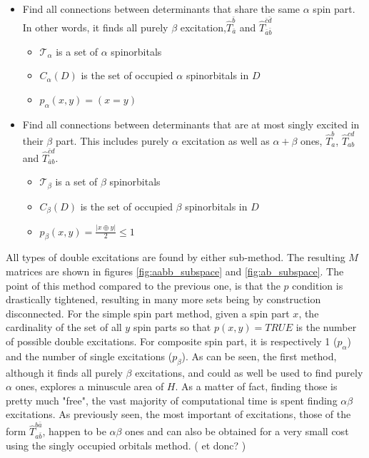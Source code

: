 \documentclass[./thesis.tex]{subfiles}
\begin{document}
\begin{itemize}
\item
Find all connections between determinants that share the same $\alpha$ spin part. In other words, it finds all purely $\beta$ excitation,$\hat T_{\bar a}^{\bar b}$ and $\hat T_{\bar a \bar b}^{\bar c \bar d}$
\begin{itemize}
	\item
$\mathcal{T}_\alpha$ is a set of $\alpha$ spinorbitals
	\item
$C_\alpha(D)$ is the set of occupied $\alpha$ spinorbitals in $D$
	\item
$p_\alpha(x, y) = (x = y)$
\end{itemize}
\item
Find all connections between determinants that are at most singly excited in their $\beta$ part.
This includes purely $\alpha$ excitation as well as $\alpha+\beta$ ones, $\hat T_a^b$, $\hat T_{ab}^{cd}$ and $\hat T_{\bar a b}^{\bar c d}$.
\begin{itemize}
	\item
$\mathcal{T}_\beta$ is a set of $\beta$ spinorbitals
	\item
$C_\beta(D)$ is the set of occupied $\beta$ spinorbitals in $D$
	\item
$p_\beta(x, y) = \frac{|x \oplus y|}{2} \leq 1$
\end{itemize}
\end{itemize}
    

All types of double excitations are found by either sub-method. The resulting $M$ matrices are shown in figures \ref{fig:aabb_subspace} and \ref{fig:ab_subspace}.
The point of this method compared to the previous one, is that the $p$ condition is drastically tightened, resulting in many more sets being by construction disconnected. For the simple spin part method, given a spin part $x$, the cardinality of the set of all $y$ spin parts so that $p(x, y) = TRUE$ is the number of possible double excitations. For composite spin part, it is respectively 1 ($p_\alpha$) and the number of single excitations ($p_\beta$).
As can be seen, the first method, although it finds all purely $\beta$ excitations, and could as well be used to find purely $\alpha$ ones, explores a minuscule area of $H$. As a matter of fact, finding those is pretty much "free", the vast majority of computational time is spent finding $\alpha \beta$ excitations.
As previously seen, the most important of excitations, those of the form $\hat T_{a \bar b}^{b \bar a}$, happen to be $\alpha \beta$ ones and can also be obtained for a very small cost using the singly occupied orbitals method. ( et donc? )
\end{document}
